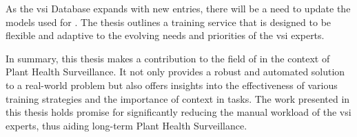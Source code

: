 As the \gls{vsi} Database expands with new entries, there will be a need to update the models used for \textclassification{}. The thesis outlines a training service that is designed to be flexible and adaptive to the evolving needs and priorities of the \gls{vsi} experts.

In summary, this thesis makes a contribution to the field of \textclassification{} in the context of Plant Health Surveillance. It not only provides a robust and automated solution to a real-world problem but also offers insights into the effectiveness of various training strategies and the importance of context in \textclassification{} tasks. The work presented in this thesis holds promise for significantly reducing the manual workload of the \gls{vsi} experts, thus aiding long-term Plant Health Surveillance.


\clearpage